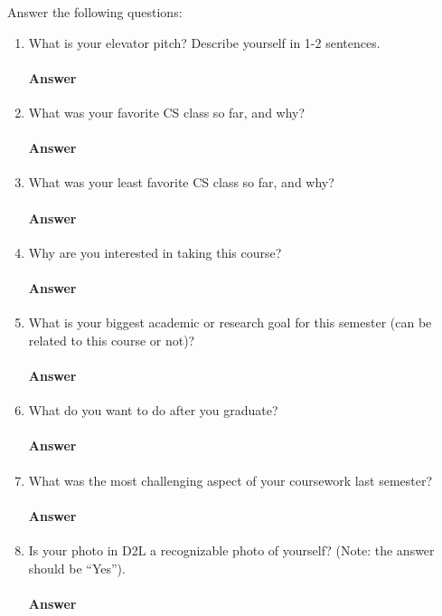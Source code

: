 \documentclass{article}
\begin{document}
Answer the following questions:
\begin{enumerate}
    \item What is your elevator pitch?  Describe yourself in 1-2
                sentences.

        \paragraph{Answer} \todo{}

     \item What was your favorite CS class so far, and why?

         \paragraph{Answer} \todo{}

     \item What was your least favorite CS class so far, and why?

         \paragraph{Answer} \todo{}

     \item Why are you interested in taking this course?

         \paragraph{Answer} \todo{}

     \item What is your biggest academic or research goal for this semester (can
         be related to this course or not)?

         \paragraph{Answer} \todo{}

     \item What do you want to do after you graduate?

         \paragraph{Answer} \todo{}

     \item What was the most challenging aspect of your coursework last semester?

         \paragraph{Answer} \todo{}

    \item Is your photo in D2L a recognizable photo of yourself?  (Note: the
        answer should be ``Yes'').

         \paragraph{Answer} \todo{}

\end{enumerate}
\end{document}
